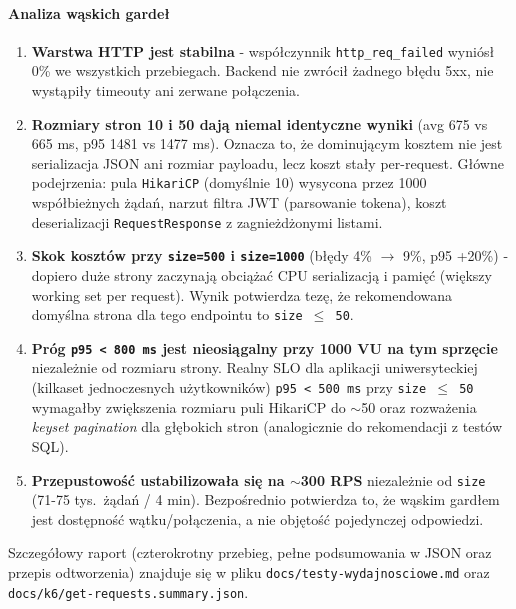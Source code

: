 \documentclass[12pt,a4paper]{article}
\begin{document}
\paragraph{Analiza wąskich gardeł}
\begin{enumerate}[leftmargin=*]
  \item \textbf{Warstwa HTTP jest stabilna} - współczynnik \texttt{http\_req\_failed}
        wyniósł 0\% we wszystkich przebiegach. Backend nie zwrócił żadnego błędu 5xx,
        nie wystąpiły timeouty ani zerwane połączenia.
  \item \textbf{Rozmiary stron 10 i 50 dają niemal identyczne wyniki}
        (avg 675 vs 665 ms, p95 1481 vs 1477 ms). Oznacza to, że dominującym
        kosztem nie jest serializacja JSON ani rozmiar payloadu, lecz koszt
        stały per-request. Główne podejrzenia: pula \texttt{HikariCP}
        (domyślnie 10) wysycona przez 1000 współbieżnych żądań, narzut filtra
        JWT (parsowanie tokena), koszt deserializacji \texttt{RequestResponse}
        z zagnieżdżonymi listami.
  \item \textbf{Skok kosztów przy \texttt{size=500} i \texttt{size=1000}}
        (błędy 4\% \(\to\) 9\%, p95 +20\%) - dopiero duże strony zaczynają
        obciążać CPU serializacją i pamięć (większy working set per request).
        Wynik potwierdza tezę, że rekomendowana domyślna strona dla tego
        endpointu to \texttt{size~\(\le\)~50}.
  \item \textbf{Próg \texttt{p95~<~800~ms} jest nieosiągalny przy 1000 VU
        na tym sprzęcie} niezależnie od rozmiaru strony. Realny SLO dla
        aplikacji uniwersyteckiej (kilkaset jednoczesnych użytkowników)
        \texttt{p95~<~500~ms} przy \texttt{size~\(\le\)~50} wymagałby
        zwiększenia rozmiaru puli HikariCP do \(\sim\)50 oraz rozważenia
        \emph{keyset pagination} dla głębokich stron (analogicznie do
        rekomendacji z testów SQL).
  \item \textbf{Przepustowość ustabilizowała się na \(\sim\)300 RPS} niezależnie
        od \texttt{size} (71-75 tys.\ żądań / 4 min). Bezpośrednio potwierdza
        to, że wąskim gardłem jest dostępność wątku/połączenia, a nie objętość
        pojedynczej odpowiedzi.
\end{enumerate}

Szczegółowy raport (czterokrotny przebieg, pełne podsumowania w JSON oraz
przepis odtworzenia) znajduje się w pliku \texttt{docs/testy-wydajnosciowe.md}
oraz \texttt{docs/k6/get-requests.summary.json}.
\end{document}
